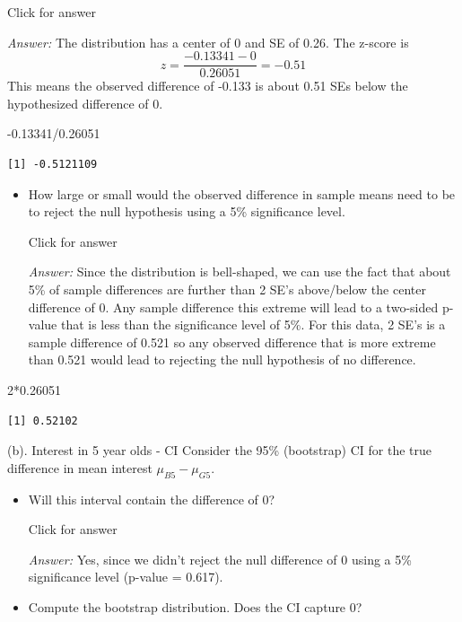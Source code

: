 \documentclass[
]{book}
\newenvironment{Shaded}{\begin{snugshade}}{\end{snugshade}}
\newcommand{\DecValTok}[1]{\textcolor[rgb]{0.00,0.00,0.81}{#1}}
\newcommand{\FloatTok}[1]{\textcolor[rgb]{0.00,0.00,0.81}{#1}}
\newcommand{\SpecialCharTok}[1]{\textcolor[rgb]{0.00,0.00,0.00}{#1}}
\providecommand{\tightlist}{%
  \setlength{\itemsep}{0pt}\setlength{\parskip}{0pt}}
\begin{document}
Click for answer

\emph{Answer:} The distribution has a center of 0 and SE of 0.26. The z-score is
\[z = \dfrac{-0.13341 - 0}{0.26051} = -0.51\]
This means the observed difference of -0.133 is about 0.51 SEs below the hypothesized difference of 0.

\begin{Shaded}
\begin{Highlighting}[]
\SpecialCharTok{{-}}\FloatTok{0.13341}\SpecialCharTok{/}\FloatTok{0.26051} 
\end{Highlighting}
\end{Shaded}

\begin{verbatim}
[1] -0.5121109
\end{verbatim}

\begin{itemize}
\tightlist
\item
  How large or small would the observed difference in sample means need to be to reject the null hypothesis using a 5\% significance level.

  Click for answer

  \emph{Answer:} Since the distribution is bell-shaped, we can use the fact that about 5\% of sample differences are further than 2 SE's above/below the center difference of 0. Any sample difference this extreme will lead to a two-sided p-value that is less than the significance level of 5\%. For this data, 2 SE's is a sample difference of 0.521 so any observed difference that is more extreme than 0.521 would lead to rejecting the null hypothesis of no difference.
\end{itemize}

\begin{Shaded}
\begin{Highlighting}[]
\DecValTok{2}\SpecialCharTok{*}\FloatTok{0.26051} 
\end{Highlighting}
\end{Shaded}

\begin{verbatim}
[1] 0.52102
\end{verbatim}

(b). Interest in 5 year olds - CI
Consider the 95\% (bootstrap) CI for the true difference in mean interest \(\mu_{B5} - \mu_{G5}\).

\begin{itemize}
\item
  Will this interval contain the difference of 0?

  Click for answer

  \emph{Answer:} Yes, since we didn't reject the null difference of 0 using a 5\% significance level (p-value = 0.617).
\item
  Compute the bootstrap distribution. Does the CI capture 0?
\end{itemize}
\end{document}
